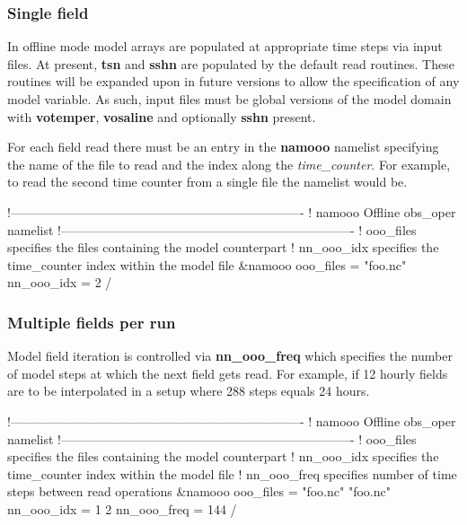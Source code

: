 \documentclass[../tex_main/NEMO_manual]{subfiles}
\begin{document}
\subsubsection{Single field}

In offline mode model arrays are populated at appropriate time steps via input files.
At present, \textbf{tsn} and \textbf{sshn} are populated by the default read routines. 
These routines will be expanded upon in future versions to allow the specification of any
model variable. As such, input files must be global versions of the model domain with
\textbf{votemper}, \textbf{vosaline} and optionally \textbf{sshn} present.

For each field read there must be an entry in the \textbf{namooo} namelist specifying the
name of the file to read and the index along the \emph{time\_counter}. For example, to
read the second time counter from a single file the namelist would be.

\begin{forlines}
!----------------------------------------------------------------------
!       namooo Offline obs_oper namelist
!----------------------------------------------------------------------
!   ooo_files    specifies the files containing the model counterpart
!   nn_ooo_idx   specifies the time_counter index within the model file
&namooo
   ooo_files = "foo.nc"
   nn_ooo_idx = 2
/
\end{forlines}

\subsubsection{Multiple fields per run}

Model field iteration is controlled via \textbf{nn\_ooo\_freq} which specifies
the number of model steps at which the next field gets read. For example, if
12 hourly fields are to be interpolated in a setup where 288 steps equals 24 hours.

\begin{forlines}
!----------------------------------------------------------------------
!       namooo Offline obs_oper namelist
!----------------------------------------------------------------------
!   ooo_files    specifies the files containing the model counterpart
!   nn_ooo_idx   specifies the time_counter index within the model file
!   nn_ooo_freq  specifies number of time steps between read operations
&namooo
   ooo_files = "foo.nc" "foo.nc"
   nn_ooo_idx = 1 2
   nn_ooo_freq = 144
/
\end{forlines}
\end{document}
